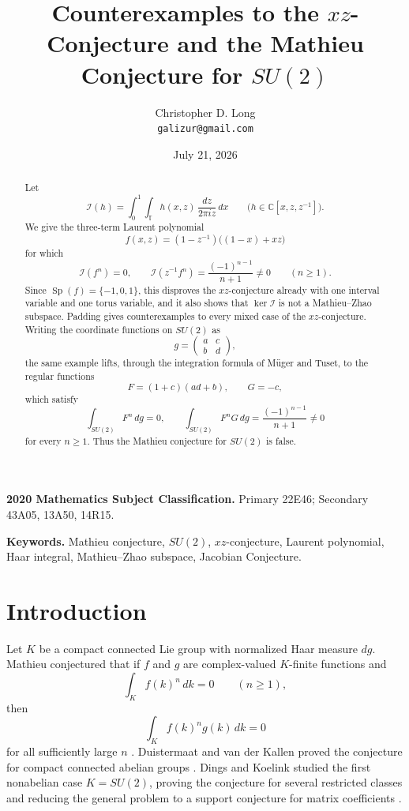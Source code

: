 \documentclass[11pt]{article}
\title{Counterexamples to the $xz$-Conjecture and the Mathieu Conjecture for $SU(2)$}
\author{Christopher D. Long\\\texttt{galizur@gmail.com}}
\date{July 21, 2026}
\newcommand{\C}{\mathbb C}
\newcommand{\T}{\mathbb T}
\newcommand{\Sp}{\operatorname{Sp}}
\newcommand{\I}{\mathcal I}
\theoremstyle{remark}
\begin{document}
\maketitle

\begin{abstract}
Let
\[
  \I(h)=\int_0^1\int_{\T}h(x,z)\,\frac{dz}{2\pi iz}\,dx
  \qquad
  \bigl(h\in\C[x,z,z^{-1}]\bigr).
\]
We give the three-term Laurent polynomial
\[
  f(x,z)=(1-z^{-1})\bigl((1-x)+xz\bigr)
\]
for which
\[
  \I(f^n)=0,
  \qquad
  \I(z^{-1}f^n)=\frac{(-1)^{n-1}}{n+1}\neq0
  \qquad(n\geq1).
\]
Since $\Sp(f)=\{-1,0,1\}$, this disproves the $xz$-conjecture already with one interval variable and one torus variable, and it also shows that $\ker\I$ is not a Mathieu--Zhao subspace.  Padding gives counterexamples to every mixed case of the $xz$-conjecture.  Writing the coordinate functions on $SU(2)$ as
\[
  g=\begin{pmatrix}a&c\\ b&d\end{pmatrix},
\]
the same example lifts, through the integration formula of M\"uger and Tuset, to the regular functions
\[
  F=(1+c)(ad+b),\qquad G=-c,
\]
which satisfy
\[
  \int_{SU(2)}F^n\,dg=0,
  \qquad
  \int_{SU(2)}F^nG\,dg=\frac{(-1)^{n-1}}{n+1}\neq0
\]
for every $n\geq1$.  Thus the Mathieu conjecture for $SU(2)$ is false.
\end{abstract}

\medskip
\noindent\textbf{2020 Mathematics Subject Classification.}
Primary 22E46; Secondary 43A05, 13A50, 14R15.

\noindent\textbf{Keywords.}
Mathieu conjecture, $SU(2)$, $xz$-conjecture, Laurent polynomial, Haar integral, Mathieu--Zhao subspace, Jacobian Conjecture.

\section{Introduction}

Let $K$ be a compact connected Lie group with normalized Haar measure $dg$.  Mathieu conjectured that if $f$ and $g$ are complex-valued $K$-finite functions and
\[
  \int_K f(k)^n\,dk=0\qquad(n\geq1),
\]
then
\[
  \int_K f(k)^n g(k)\,dk=0
\]
for all sufficiently large $n$ \cite{Mathieu}.  Duistermaat and van der Kallen proved the conjecture for compact connected abelian groups \cite{DvK}.  Dings and Koelink studied the first nonabelian case $K=SU(2)$, proving the conjecture for several restricted classes and reducing the general problem to a support conjecture for matrix coefficients \cite{DingsKoelink}.
\end{document}
